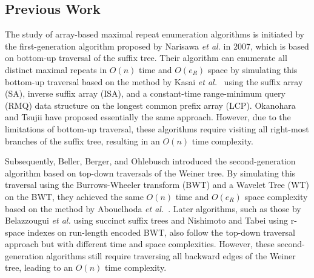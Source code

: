 
\subsection{Previous Work}

The study of array-based maximal repeat enumeration algorithms is initiated by the first-generation algorithm proposed by Narisawa \textit{et al.} in 2007, which is based on bottom-up traversal of the suffix tree. Their algorithm can enumerate all distinct maximal repeats in $O(n)$ time and $O(e_R)$ space by simulating this bottom-up traversal based on the method by Kasai \textit{et al.}~\cite{kasai:lee2001lcp:linear} using the suffix array (SA), inverse suffix array (ISA), and a constant-time range-minimum query (RMQ) data structure on the longest common prefix array (LCP). Okanohara and Tsujii have proposed essentially the same approach. However, due to the limitations of bottom-up traversal, these algorithms require visiting all right-most branches of the suffix tree, resulting in an $O(n)$ time complexity.

Subsequently, Beller, Berger, and Ohlebusch introduced the second-generation algorithm based on top-down traversals of the Weiner tree. By simulating this traversal using the Burrows-Wheeler transform (BWT) and a Wavelet Tree (WT) on the BWT, they achieved the same $O(n)$ time and $O(e_R)$ space complexity based on the method by Abouelhoda \textit{et al.}~\cite{abouelhoda2004replacing}. Later algorithms, such as those by Belazzougui \textit{et al.} using succinct suffix trees and Nishimoto and Tabei using r-space indexes on run-length encoded BWT, also follow the top-down traversal approach but with different time and space complexities. However, these second-generation algorithms still require traversing all backward edges of the Weiner tree, leading to an $O(n)$ time complexity.

